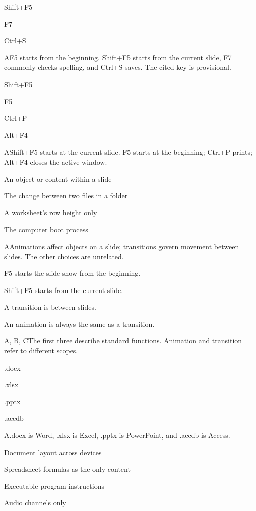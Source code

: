 \begin{enumerate}[label=\textbf{Q\arabic*.}, leftmargin=*]
{   \item Shift+F5
   \item F7
   \item Ctrl+S}
  {A}{F5 starts from the beginning. Shift+F5 starts from the current slide, F7 commonly checks spelling, and Ctrl+S saves. The cited key is provisional.}
  {\item Shift+F5
   \item F5
   \item Ctrl+P
   \item Alt+F4}
  {A}{Shift+F5 starts at the current slide. F5 starts at the beginning; Ctrl+P prints; Alt+F4 closes the active window.}
  {\item An object or content within a slide
   \item The change between two files in a folder
   \item A worksheet's row height only
   \item The computer boot process}
  {A}{Animations affect objects on a slide; transitions govern movement between slides. The other choices are unrelated.}
  {\item F5 starts the slide show from the beginning.
   \item Shift+F5 starts from the current slide.
   \item A transition is between slides.
   \item An animation is always the same as a transition.}
  {A, B, C}{The first three describe standard functions. Animation and transition refer to different scopes.}
\fi
\ifnum{}
  {\item .docx
   \item .xlsx
   \item .pptx
   \item .accdb}
  {A}{.docx is Word, .xlsx is Excel, .pptx is PowerPoint, and .accdb is Access.}
  {\item Document layout across devices
   \item Spreadsheet formulas as the only content
   \item Executable program instructions
   \item Audio channels only}

\end{enumerate}
